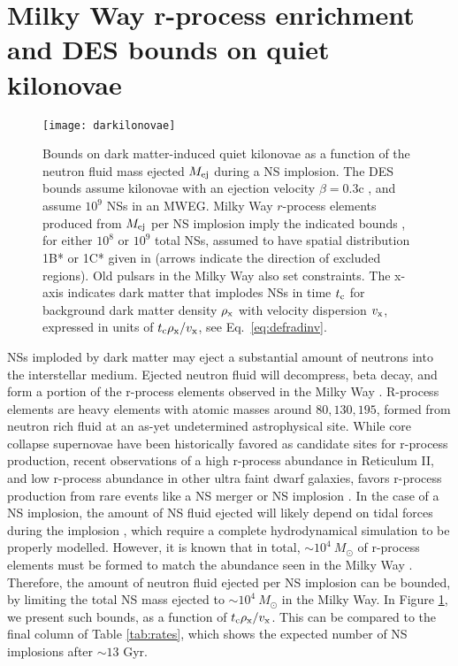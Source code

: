 \documentclass[nofootinbib,longbibliography,prd,floatfix,superscriptaddress,twocolumn]{revtex4-1}
\begin{document}
\section{Milky Way r-process enrichment and DES bounds on quiet kilonovae}
\label{sec:qk}
\begin{figure}[t!]
\texttt{[image: darkilonovae]}
\caption{Bounds on dark matter-induced quiet kilonovae as a function of the neutron fluid mass ejected $M_{\rm ej}$ during a NS implosion. The DES bounds assume kilonovae with an ejection velocity $\beta=0.3$c \cite{Doctor:2016gdi}, and assume $10^9$ NSs in an MWEG. Milky Way $r$-process elements produced from $M_{\rm ej}$ per NS implosion imply the indicated bounds \cite{Bramante:2016mzo}, for either $10^8$ or $10^9$ total NSs, assumed to have spatial distribution 1B* or 1C* given in \cite{2010A&A...510A..23S} (arrows indicate the direction of excluded regions). Old pulsars in the Milky Way \cite{Bramante:2014zca,Bramante:2015dfa} also set constraints. The x-axis indicates dark matter that implodes NSs in time $t_{\rm c}$ for background dark matter density $\rho_{\rm x} $ with velocity dispersion $v_{\rm x}$, expressed in units of $ t_{\rm c} \rho_{\rm x} / v_{\rm x}$, see Eq.~\eqref{eq:defradinv}.}
\label{fig:mejecta}
\end{figure}
NSs imploded by dark matter may eject a substantial amount of neutrons into the interstellar medium. Ejected neutron fluid will decompress, beta decay, and form a portion of the r-process elements observed in the Milky Way \cite{1977ApJ...213..225L,1989Natur.340..126E,Kasen:2013xka,Bramante:2016mzo}. R-process elements are heavy elements with atomic masses around $80, 130,195$, formed from neutron rich fluid at an as-yet undetermined astrophysical site. While core collapse supernovae have been historically favored as candidate sites for r-process production, recent observations of a high r-process abundance in Reticulum II, and low r-process abundance in other ultra faint dwarf galaxies, favors r-process production from rare events like a NS merger \cite{2016Natur.531..610J} or NS implosion \cite{Bramante:2016mzo}. In the case of a NS implosion, the amount of NS fluid ejected will likely depend on tidal forces during the implosion \cite{Bramante:2016mzo}, which require a complete hydrodynamical simulation to be properly modelled.  However, it is known that in total,  $\sim 10^4~M_{\odot}$ of r-process elements must be formed to match the abundance seen in the Milky Way \cite{2015MNRAS.447..140V,2015ApJ...807..115S,Wehmeyer:2015sra}. Therefore, the amount of neutron fluid ejected per NS implosion can be bounded, by limiting the total NS mass ejected to $\sim 10^4~M_{\odot}$ in the Milky Way. In Figure \ref{fig:mejecta}, we present such bounds, as a function of $t_{\rm c} \rho_{\rm x} /v_{\rm x}$. This can be compared to the final column of Table \ref{tab:rates}, which shows the expected number of NS implosions after $\sim 13$ Gyr.
\end{document}
